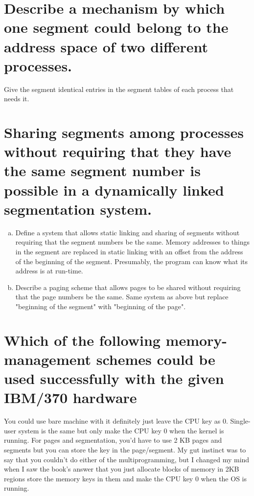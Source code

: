 \documentclass{book}%
\begin{document}
\section{Describe a mechanism by which one segment could belong to the address
space of two different processes.}
Give the segment identical entries in the segment tables of each process that 
needs it.
\section{Sharing segments among processes without requiring that they have the 
same segment number is possible in a dynamically linked segmentation system.}
\begin{enumerate}[(a)]
\item Define a system that allows static linking and sharing of segments without
requiring that the segment numbers be the same.
Memory addresses to things in the segment are replaced in static linking with an
offset from the address of the beginning of the segment. Presumably, the program
can know what its address is at run-time.
\item Describe a paging scheme that allows pages to be shared without requiring
that the page numbers be the same. 
Same system as above but replace "beginning of the segment" with "beginning of
the page".
\end{enumerate}
\section{Which of the following memory-management schemes could be used
successfully with the given IBM/370 hardware}
You could use bare machine with it definitely just leave the CPU key as 0.
Single-user system is the same but only make the CPU key 0 when the kernel is
running. For pages and segmentation, you'd have to use 2 KB pages and segments
but you can store the key in the page/segment. My gut instinct was to say that
you couldn't do either of the multiprogramming, but I changed my mind when I saw
the book's answer that you just allocate blocks of memory in 2KB regions store
the memory keys in them and make the CPU key 0 when the OS is running.
\end{document}
